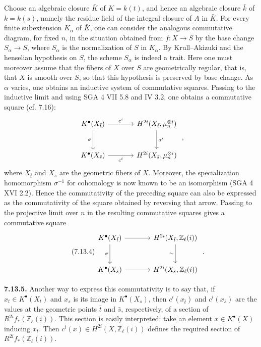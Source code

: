Choose an algebraic closure $\bar K$ of $K=k(t)$, and hence an algebraic
closure $\bar k$ of $k=k(s)$, namely the residue field of the integral closure
of $A$ in $\bar K$. For every finite subextension $K_\alpha$ of $\bar K$, one
can consider the analogous commutative diagram, for fixed $n$, in the
situation obtained from $f:X\to S$ by the base change $S_\alpha\to S$, where
$S_\alpha$ is the normalization of $S$ in $K_\alpha$. By Krull--Akizuki and
the henselian hypothesis on $S$, the scheme $S_\alpha$ is indeed a trait.
Here one must moreover assume that the fibers of $X$ over $S$ are
geometrically regular, that is, that $X$ is smooth over $S$, so that this
hypothesis is preserved by base change. As $\alpha$ varies, one obtains an
inductive system of commutative squares. Passing to the inductive limit and
using SGA 4 VII 5.8 and IV 3.2, one obtains a commutative square (cf. 7.16):
\[
\begin{tikzcd}[column sep=large,row sep=large]
K^\bullet(X_{\bar t}) \arrow[r,"c^i"] \arrow[d,"\sigma"'] &
H^{2i}(X_{\bar t},\mu_n^{\otimes i}) \arrow[d,"\sigma'"]\\
K^\bullet(X_{\bar s}) \arrow[r,"c^i"'] &
H^{2i}(X_{\bar s},\mu_n^{\otimes i})
\end{tikzcd}
\;,
\]
where $X_{\bar t}$ and $X_{\bar s}$ are the geometric fibers of $X$.
Moreover, the specialization homomorphism $\sigma^{-1}$ for cohomology is
now known to be an isomorphism (SGA 4 XVI 2.2). Hence the commutativity of the
preceding square can also be expressed as the commutativity of the square
obtained by reversing that arrow. Passing to the projective limit over $n$ in
the resulting commutative squares gives a commutative square
\begin{equation}\tag{7.13.4}
\begin{tikzcd}[column sep=large,row sep=large]
K^\bullet(X_{\bar t}) \arrow[r] \arrow[d,"\sigma"'] &
H^{2i}(X_{\bar t},\mathbb Z_\ell(i)) \arrow[d,"\sim"']\\
K^\bullet(X_{\bar s}) \arrow[r] &
H^{2i}(X_{\bar s},\mathbb Z_\ell(i))
\end{tikzcd}
\;.
\end{equation}

\textbf{7.13.5.}
Another way to express this commutativity is to say that, if
$x_t\in K^\bullet(X_t)$ and $x_s$ is its image in $K^\bullet(X_s)$, then
$c^i(x_{\bar t})$ and $c^i(x_{\bar s})$ are the values at the geometric
points $\bar t$ and $\bar s$, respectively, of a section of
$R^{2i}f_*(\mathbb Z_\ell(i))$. This section is easily interpreted: take an
element $x\in K^\bullet(X)$ inducing $x_t$. Then
$c^i(x)\in H^{2i}(X,\mathbb Z_\ell(i))$ defines the required section of
$R^{2i}f_*(\mathbb Z_\ell(i))$.


